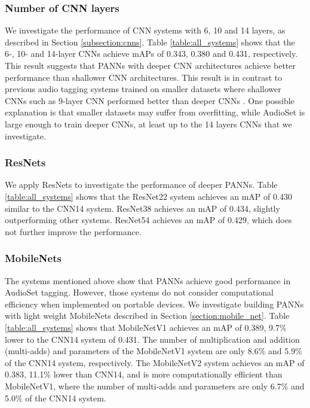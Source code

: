 \documentclass[journal]{IEEEtran}
\begin{document}
\subsubsection{Number of CNN layers}
We investigate the performance of CNN systems with 6, 10 and 14 layers, as described in Section \ref{subsection:cnns}. Table \ref{table:all_systems} shows that the 6-, 10- and 14-layer CNNs achieve mAPs of 0.343, 0.380 and 0.431, respectively. This result suggests that PANNs with deeper CNN architectures achieve better performance than shallower CNN architectures. This result is in contrast to previous audio tagging systems trained on smaller datasets where shallower CNNs such as 9-layer CNN performed better than deeper CNNs \cite{kong2019cross}. One possible explanation is that smaller datasets may suffer from overfitting, while AudioSet is large enough to train deeper CNNs, at least up to the 14 layers CNNs that we investigate.

\subsubsection{ResNets}
We apply ResNets to investigate the performance of deeper PANNs. Table \ref{table:all_systems} shows that the ResNet22 system achieves an mAP of 0.430 similar to the CNN14 system. ResNet38 achieves an mAP of 0.434, slightly outperforming other systems. ResNet54 achieves an mAP of 0.429, which does not further improve the performance.



\subsubsection{MobileNets}

The systems mentioned above show that PANNs achieve good performance in AudioSet tagging. However, those systems do not consider computational efficiency when implemented on portable devices. We investigate building PANNs with light weight MobileNets described in Section \ref{section:mobile_net}. Table \ref{table:all_systems} shows that MobileNetV1 achieves an mAP of 0.389, 9.7\% lower to the CNN14 system of 0.431. The number of multiplication and addition (multi-adds) and parameters of the MobileNetV1 system are only 8.6\% and 5.9\% of the CNN14 system, respectively. The MobileNetV2 system achieves an mAP of 0.383, 11.1\% lower than CNN14, and is more computationally efficient than MobileNetV1, where the number of multi-adds and parameters are only 6.7\% and 5.0\% of the CNN14 system. 
\end{document}
